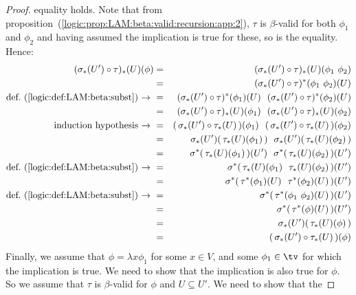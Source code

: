 \begin{proof}
    equality holds. Note that from 
    proposition~(\ref{logic:prop:LAM:beta:valid:recursion:app:2}), $\tau$ is
    $\beta$-valid for both $\phi_{1}$ and $\phi_{2}$ and having assumed
    the implication is true for these, so is the equality. Hence:
        \begin{eqnarray*}(\sigma_{*}(U')\circ\tau)_{*}(U)(\phi)
            &=&(\sigma_{*}(U')\circ\tau)_{*}(U)(\phi_{1}\ \phi_{2})\\
            &=&(\sigma_{*}(U')\circ\tau)^{*}(\phi_{1}\ \phi_{2})(U)\\
            \mbox{def.~(\ref{logic:def:LAM:beta:subst})\ $\to$\ }
            &=&(\sigma_{*}(U')\circ\tau)^{*}(\phi_{1})(U)\ \ 
               (\sigma_{*}(U')\circ\tau)^{*}(\phi_{2})(U)\\
            &=&(\sigma_{*}(U')\circ\tau)_{*}(U)(\phi_{1})\ \ 
               (\sigma_{*}(U')\circ\tau)_{*}(U)(\phi_{2})\\
            \mbox{induction hypothesis$\ \to\ $}
            &=&(\,\sigma_{*}(U')\circ\tau_{*}(U)\,)(\phi_{1})\ \ 
               (\,\sigma_{*}(U')\circ\tau_{*}(U)\,)(\phi_{2})\\
            &=&\sigma_{*}(U')(\,\tau_{*}(U)(\phi_{1})\,)\ \ 
               \sigma_{*}(U')(\,\tau_{*}(U)(\phi_{2})\,)\\
            &=&\sigma^{*}(\,\tau_{*}(U)(\phi_{1})\,)(U')\ \ 
               \sigma^{*}(\,\tau_{*}(U)(\phi_{2})\,)(U')\\
            \mbox{def.~(\ref{logic:def:LAM:beta:subst})\ $\to$\ }
            &=&\sigma^{*}(\,\tau_{*}(U)(\phi_{1})\ \ 
                            \tau_{*}(U)(\phi_{2})\,)(U')\\ 
            &=&\sigma^{*}(\,\tau^{*}(\phi_{1})(U)\ \ 
                            \tau^{*}(\phi_{2})(U)\,)(U')\\
            \mbox{def.~(\ref{logic:def:LAM:beta:subst})\ $\to$\ }
            &=&\sigma^{*}(\,\tau^{*}(\phi_{1}\ \phi_{2})(U)\,)(U')\\
            &=&\sigma^{*}(\,\tau^{*}(\phi)(U)\,)(U')\\
            &=&\sigma_{*}(U')(\,\tau_{*}(U)(\phi)\,)\\
            &=&(\,\sigma_{*}(U')\circ\tau_{*}(U)\,)(\phi)
        \end{eqnarray*}
    Finally, we assume that $\phi=\lambda x\phi_{1}$ for some $x\in V$, and
    some $\phi_{1}\in\tv$ for which the implication is true. We need to show
    that the implication is also true for $\phi$. So we assume that $\tau$ is
    $\beta$-valid for $\phi$ and $U\subseteq U'$. We need to show that the 

\end{proof}
